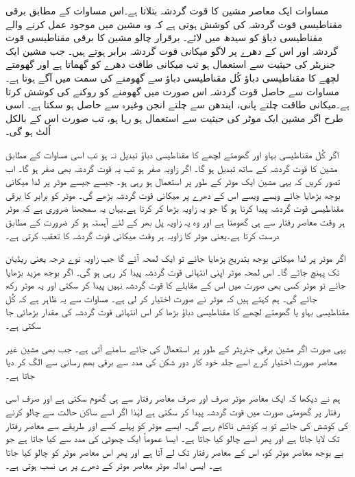 مساوات   ایک معاصر مشین کا قوت گردشہ بتلاتا ہے۔اس مساوات کے مطابق برقی مقناطیسی قوت گردشہ کی کوشش ہوتی ہے کہ وہ مشین میں موجود عمل کرنے والے مقناطیسی دباؤ کو سیدھ میں لائے۔ برقرار  چالو  مشین کا برقی مقناطیسی قوت گردشہ اور اس کے دھرے پر لاگو میکانی قوت گردشہ برابر ہوتے ہیں۔ جب مشین ایک جنریٹر کی حیثیت سے استعمال ہو تب میکانی طاقت  دھرے کو گھماتا ہے اور گھومتے لچھے کا مقناطیسی دباؤ کُل مقناطیسی دباؤ سے گھومنے کی سمت میں آگے ہوتا ہے۔ مساوات  سے حاصل قوت گردشہ اس صورت میں گھومنے کو روکنے کی کوشش کرتا ہے۔میکانی طاقت چلتے پانی، ایندھن سے چلتے انجن وغیرہ سے حاصل ہو سکتا ہے۔ اسی طرح اگر مشین ایک موٹر کی حیثیت سے استعمال ہو رہا ہو، تب صورت اس کے بالکل اُلٹ ہو گی۔

اگر کُل مقناطیسی بہاو   اور گھومتے لچھے کا مقناطیسی دباؤ  تبدیل نہ ہو تب اسی مساوات کے مطابق مشین کا قوت گردشہ   کے ساتھ تبدیل ہو گا۔ اگر زاویہ  صفر ہو تب یہ قوت گردشہ بھی صفر ہو گا۔ اب  تصور کریں کہ یہی مشین ایک موٹر کے طور پر استعمال ہو رہی ہو۔ جیسے جیسے موٹر پر لدا میکانی بوجھ بڑھایا جائے ویسے ویسے اس کے دھرے پر میکانی قوت گردشہ بڑھے گی۔ موٹر کو برابر کا برقی مقناطیسی قوت گردشہ پیدا کرنا ہو گا جو یہ زاویہ بڑھا کر کرتا ہے۔یہاں یہ سمجھنا ضروری ہے کہ موٹر ہر وقت معاصر رفتار سے ہی گھومتا ہے اور وہ یہ زاویہ پل بھر کے لئے آہستہ ہو کر ضرورت کے مطابق درست کرتا ہے۔یعنی موٹر کا زاویہ  ہر وقت میکانی قوت گردشہ کا تعقب  کرتی ہے۔

اگر موٹر پر لدا میکانی بوجھ بتدریج بڑھایا جائے تو ایک لمحہ آئے گا جب زاویہ  نوے درجہ یعنی   ریڈیئن تک پہنچ جائے گا۔ اس لمحہ موٹر اپنی انتہائی قوت گردشہ  پیدا کر رہی ہو گی۔ اگر بوجھ  مزید بڑھایا جائے تو موٹر کسی بھی صورت میں اس کے مقابلے کا قوت گردشہ نہیں پیدا کر سکتی اور یہ موٹر رکھ جائے گی۔ ہم کہتے ہیں کہ موٹر نے  صورت اختیار کر لی ہے۔ مساوات سے یہ ظاہر ہے کہ کُل مقناطیسی بہاو یا گھومتے لچھے کا مقناطیسی دباؤ بڑھا کر اس انتہائی قوت گردشہ کی مقدار بڑھائی جا سکتی ہے۔

یہی صورت اگر مشین برقی جنریٹر کے طور پر استعمال کی جائے سامنے آتی ہے۔ جب بھی مشین غیر معاصر صورت اختیار کرے اسے جلد خود کار  دور شکن کی مدد سے برقی بھم رسانی سے الگ کر دیا جاتا ہے۔

ہم نے دیکھا کہ ایک معاصر موٹر صرف اور صرف معاصر رفتار سے ہی گھوم سکتی ہے اور صرف اسی رفتار پر گھومتی صورت میں قوت گردشہ پیدا کر سکتی ہے لہٰذا اگر اسے ساکن حالت سے چالو  کرنے کی کوشش کی جائے تو یہ کوشش ناکام رہے گی۔ ایسے موٹر کو پہلے کسے اور طریقے سے معاصر رفتار تک لایا جاتا ہے اور پھر اسے چالو کیا جاتا ہے۔ ایسا عموماً ایک چھوٹی   کی مدد سے کیا جاتا ہے جو بے بوجھ معاصر موٹر کو، اس کے معاصر رفتار تک لے آتا ہے اور پھر اس معاصر موٹر کو چالو کیا جاتا ہے۔ ایسی امالہ موٹر معاصر موٹر کے دھرے پر ہی نسب ہوتی ہے۔

